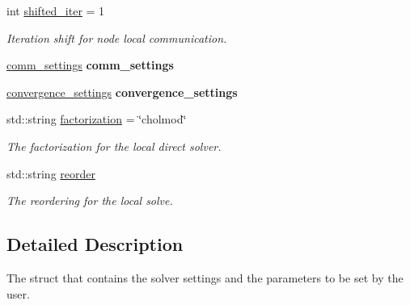 \begin{DoxyCompactItemize}
\mbox{\label{structSchwarzWrappers_1_1Settings_ac6c824118e57cdcd238cb3aa51d9eef2}} 
int \hyperlink{structSchwarzWrappers_1_1Settings_ac6c824118e57cdcd238cb3aa51d9eef2}{shifted\+\_\+iter} = 1
\begin{DoxyCompactList}\small\item\em Iteration shift for node local communication. \end{DoxyCompactList}\item 
\mbox{\label{structSchwarzWrappers_1_1Settings_ae1249cc74cfee69b680a32ab4a7f19dd}} 
\hyperlink{structSchwarzWrappers_1_1Settings_1_1comm__settings}{comm\+\_\+settings} {\bfseries comm\+\_\+settings}
\item 
\mbox{\label{structSchwarzWrappers_1_1Settings_ac33419832f34b51869eaaac7422cfce8}} 
\hyperlink{structSchwarzWrappers_1_1Settings_1_1convergence__settings}{convergence\+\_\+settings} {\bfseries convergence\+\_\+settings}
\item 
\mbox{\label{structSchwarzWrappers_1_1Settings_aea474e741912d9b9fed9d8cc948739a5}} 
std\+::string \hyperlink{structSchwarzWrappers_1_1Settings_aea474e741912d9b9fed9d8cc948739a5}{factorization} = \char`\"{}cholmod\char`\"{}
\begin{DoxyCompactList}\small\item\em The factorization for the local direct solver. \end{DoxyCompactList}\item 
\mbox{\label{structSchwarzWrappers_1_1Settings_aad5c51cd5a726e41c008229886ee61b9}} 
std\+::string \hyperlink{structSchwarzWrappers_1_1Settings_aad5c51cd5a726e41c008229886ee61b9}{reorder}
\begin{DoxyCompactList}\small\item\em The reordering for the local solve. \end{DoxyCompactList}\end{DoxyCompactItemize}


\subsection{Detailed Description}
The struct that contains the solver settings and the parameters to be set by the user. 

